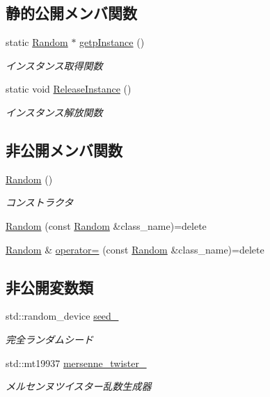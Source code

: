 \subsection*{静的公開メンバ関数}
\begin{DoxyCompactItemize}
\item 
static \mbox{\hyperlink{class_random}{Random}} $\ast$ \mbox{\hyperlink{class_random_a96dbaee553997a71a331fb0b335aa72d}{getp\+Instance}} ()
\begin{DoxyCompactList}\small\item\em インスタンス取得関数 \end{DoxyCompactList}\item 
static void \mbox{\hyperlink{class_random_aad4d635b6fddc21bedf7458b0ce49636}{Release\+Instance}} ()
\begin{DoxyCompactList}\small\item\em インスタンス解放関数 \end{DoxyCompactList}\end{DoxyCompactItemize}
\subsection*{非公開メンバ関数}
\begin{DoxyCompactItemize}
\item 
\mbox{\hyperlink{class_random_acb76b49c3903a3c4fb67fd216341f08d}{Random}} ()
\begin{DoxyCompactList}\small\item\em コンストラクタ \end{DoxyCompactList}\item 
\mbox{\hyperlink{class_random_a6ae0395173fd90135e5f4fc643532f1f}{Random}} (const \mbox{\hyperlink{class_random}{Random}} \&class\+\_\+name)=delete
\item 
\mbox{\hyperlink{class_random}{Random}} \& \mbox{\hyperlink{class_random_a233dc764071ecf4e95619ea86f7edf61}{operator=}} (const \mbox{\hyperlink{class_random}{Random}} \&class\+\_\+name)=delete
\end{DoxyCompactItemize}
\subsection*{非公開変数類}
\begin{DoxyCompactItemize}
\item 
std\+::random\+\_\+device \mbox{\hyperlink{class_random_a9dec4a6da7decaf52f9e972f63cc679c}{seed\+\_\+}}
\begin{DoxyCompactList}\small\item\em 完全ランダムシード \end{DoxyCompactList}\item 
std\+::mt19937 \mbox{\hyperlink{class_random_a149a0bd07119c7e33a4b838be0c53da9}{mersenne\+\_\+twister\+\_\+}}
\begin{DoxyCompactList}\small\item\em メルセンヌツイスター乱数生成器 \end{DoxyCompactList}\end{DoxyCompactItemize}
